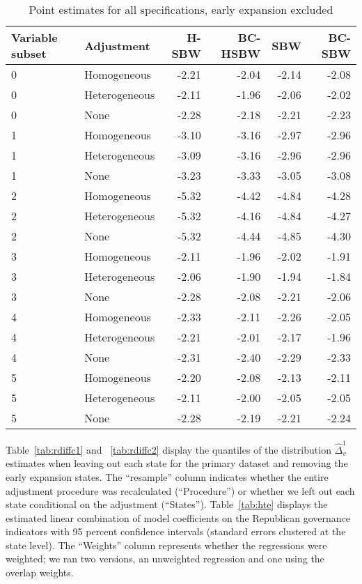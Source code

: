 \begin{table}[ht]
\centering
   \caption{Point estimates for all specifications, early expansion excluded}
    \label{tab:secondaryptests}
\begin{tabular}{llrrrr}
  \hline
Variable subset & Adjustment & H-SBW & BC-HSBW & SBW & BC-SBW \\ 
  \hline
0 & Homogeneous & -2.21 & -2.04 & -2.14 & -2.08 \\ 
  0 & Heterogeneous & -2.11 & -1.96 & -2.06 & -2.02 \\ 
  0 & None & -2.28 & -2.18 & -2.21 & -2.23 \\ 
  1 & Homogeneous & -3.10 & -3.16 & -2.97 & -2.96 \\ 
  1 & Heterogeneous & -3.09 & -3.16 & -2.96 & -2.96 \\ 
  1 & None & -3.23 & -3.33 & -3.05 & -3.08 \\ 
  2 & Homogeneous & -5.32 & -4.42 & -4.84 & -4.28 \\ 
  2 & Heterogeneous & -5.32 & -4.16 & -4.84 & -4.27 \\ 
  2 & None & -5.32 & -4.44 & -4.85 & -4.30 \\ 
  3 & Homogeneous & -2.11 & -1.96 & -2.02 & -1.91 \\ 
  3 & Heterogeneous & -2.06 & -1.90 & -1.94 & -1.84 \\ 
  3 & None & -2.28 & -2.08 & -2.21 & -2.06 \\ 
  4 & Homogeneous & -2.33 & -2.11 & -2.26 & -2.05 \\ 
  4 & Heterogeneous & -2.21 & -2.01 & -2.17 & -1.96 \\ 
  4 & None & -2.31 & -2.40 & -2.29 & -2.33 \\ 
  5 & Homogeneous & -2.20 & -2.08 & -2.13 & -2.11 \\ 
  5 & Heterogeneous & -2.11 & -2.00 & -2.05 & -2.05 \\ 
  5 & None & -2.28 & -2.19 & -2.21 & -2.24 \\ 
   \hline
\end{tabular}
\end{table}

Table~\ref{tab:rdiffc1} and ~\ref{tab:rdiffc2} display the quantiles of the distribution $\hat{\Delta}_v^1$ estimates when leaving out each state for the primary dataset and removing the early expansion states. The ``resample'' column indicates whether the entire adjustment procedure was recalculated (``Procedure'') or whether we left out each state conditional on the adjustment (``States''). Table~\ref{tab:hte} displays the estimated linear combination of model coefficients on the Republican governance indicators with 95 percent confidence intervals (standard errors clustered at the state level). The ``Weights'' column represents whether the regressions were weighted; we ran two versions, an unweighted regression and one using the overlap weights.

